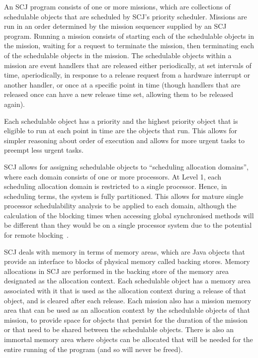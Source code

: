 \documentclass[a4paper,10pt]{article}
\begin{document}
An SCJ program consists of one or more missions, which are collections of
schedulable objects that are scheduled by SCJ's priority scheduler. Missions are
run in an order determined by the mission sequencer supplied by an SCJ
program. Running a mission consists of starting each of the schedulable objects
in the mission, waiting for a request to terminate the mission, then terminating
each of the schedulable objects in the mission.  The schedulable objects within
a mission are event handlers that are released either periodically, at set
intervals of time, aperiodically, in response to a release request from a
hardware interrupt or another handler, or once at a specific point in time
(though handlers that are released once can have a new release time set,
allowing them to be released again).

Each schedulable object has a priority and the highest priority object that is
eligible to run at each point in time are the objects that run. This allows for
simpler reasoning about order of execution and allows for more urgent tasks to
preempt less urgent tasks.

SCJ allows for assigning schedulable objects to ``scheduling allocation
domains'', where each domain consists of one or more processors.  At Level 1,
each scheduling allocation domain is restricted to a single processor.  Hence,
in scheduling terms, the system is fully partitioned. This allows for mature
single processor schedulability analysis to be applied to each domain, although
the calculation of the blocking times when accessing global synchronised methods
will be different than they would be on a single processor system due to the
potential for remote blocking~\cite{davis2011}.

SCJ deals with memory in terms of memory areas, which are Java objects that
provide an interface to blocks of physical memory called backing stores.  Memory
allocations in SCJ are performed in the backing store of the memory area
designated as the allocation context.  Each schedulable object has a memory area
associated with it that is used as the allocation context during a release of
that object, and is cleared after each release.  Each mission also has a mission
memory area that can be used as an allocation context by the schedulable objects
of that mission, to provide space for objects that persist for the duration of
the mission or that need to be shared between the schedulable objects.  There is
also an immortal memory area where objects can be allocated that will be needed
for the entire running of the program (and so will never be freed).
\end{document}
